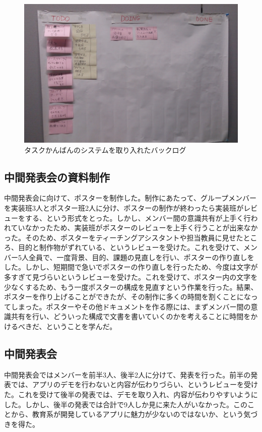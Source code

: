 \documentclass[openany,11pt,papersize]{jsbook}
\begin{document}
\begin{figure}[H]
\begin{center}
\includegraphics[width=14cm, bb=0 0 1206 783]{img/TaskKanban.png}
\end{center}
\caption{タスクかんばんのシステムを取り入れたバックログ}
\end{figure}


\subsection{中間発表会の資料制作}
\par 中間発表会に向けて、ポスターを制作した。制作にあたって、グループメンバーを実装班3人とポスター班2人に分け、ポスターの制作が終わったら実装班がレビューをする、という形式をとった。しかし、メンバー間の意識共有が上手く行われていなかったため、実装班がポスターのレビューを上手く行うことが出来なかった。そのため、ポスターをティーチングアシスタントや担当教員に見せたところ、目的と制作物がずれている、というレビューを受けた。これを受けて、メンバー5人全員で、一度背景、目的、課題の見直しを行い、ポスターの作り直しをした。しかし、短期間で急いでポスターの作り直しを行ったため、今度は文字が多すぎて見づらいというレビューを受けた。これを受けて、ポスター内の文字を少なくするため、もう一度ポスターの構成を見直すという作業を行った。結果、ポスターを作り上げることができたが、その制作に多くの時間を割くことになってしまった。ポスターやその他ドキュメントを作る際には、まずメンバー間の意識共有を行い、どういった構成で文書を書いていくのかを考えることに時間をかけるべきだ、ということを学んだ。


\subsection{中間発表会}
\par 中間発表会ではメンバーを前半3人、後半2人に分けて、発表を行った。前半の発表では、アプリのデモを行わないと内容が伝わりづらい、というレビューを受けた。これを受けて後半の発表では、デモを取り入れ、内容が伝わりやすいようにした。しかし、後半の発表では合計で9人しか見に来た人がいなかった。このことから、教育系が開発しているアプリに魅力が少ないのではないか、という気づきを得た。
\end{document}

